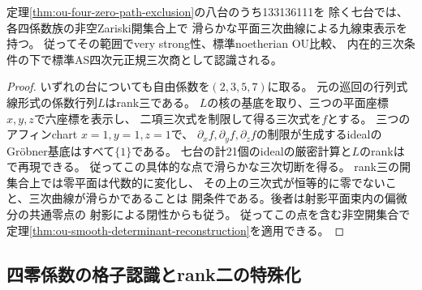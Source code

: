 \begin{proposition}[四零係数の七族の非空開集合上での曲線表示]
\label{prop:ou-four-zero-smooth-open}
定理\ref{thm:ou-four-zero-path-exclusion}の八台のうち133136111を
除く七台では、各四係数族の非空Zariski開集合上で
滑らかな平面三次曲線による九線束表示を持つ。
従ってその範囲でvery strong性、標準noetherian OU比較、
内在的三次条件の下で標準AS四次元正規三次商として認識される。
\end{proposition}
\begin{proof}
いずれの台についても自由係数を$(2,3,5,7)$に取る。
元の巡回の行列式線形式の係数行列$L$はrank三である。
$L$の核の基底を取り、三つの平面座標$x,y,z$で六座標を表示し、
二項三次式を制限して得る三次式を$f$とする。
三つのアフィンchart $x=1,y=1,z=1$で、
$\partial_x f,\partial_y f,\partial_z f$の制限が生成するidealの
Gröbner基底はすべて$\{1\}$である。
七台の計21個のidealの厳密計算と$L$のrankは
で再現できる。
従ってこの具体的な点で滑らかな三次切断を得る。
rank三の開集合上では零平面は代数的に変化し、
その上の三次式が恒等的に零でないこと、三次曲線が滑らかであることは
開条件である。後者は射影平面束内の偏微分の共通零点の
射影による閉性からも従う。
従ってこの点を含む非空開集合で
定理\ref{thm:ou-smooth-determinant-reconstruction}を適用できる。
\end{proof}

\subsection{四零係数の格子認識とrank二の特殊化}
\label{subsec:ou-four-zero-grid}

